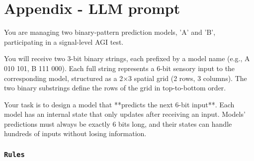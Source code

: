 \documentclass{article}
\newenvironment{ttquote}{
  \begin{minipage}[t]{0.9\linewidth}
  \ttfamily
  \setlength{\parindent}{0pt}   %
  \setlength{\parskip}{0.7em}   %
}{
  \end{minipage}
}
\begin{document}
\newpage

\appendix
\section*{Appendix - LLM prompt}

\begin{ttquote}
You are managing two binary-pattern prediction models, 'A' and 'B', participating in a signal-level AGI test.

You will receive two 3-bit binary strings, each prefixed by a model name (e.g., A 010 101, B 111 000). Each full string represents a 6-bit sensory input to the corresponding model, structured as a 2×3 spatial grid (2 rows, 3 columns). The two binary substrings define the rows of the grid in top-to-bottom order.

Your task is to design a model that **{predicts the next 6-bit input}**. Each model has an internal state that only updates after receiving an input. Models' predictions must always be exactly 6 bits long, and their states can handle hundreds of inputs without losing information.

\subsubsection*{\texttt{Rules}}


\end{ttquote}
\end{document}
